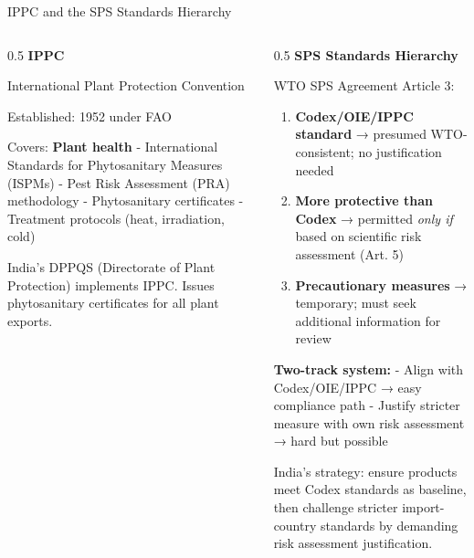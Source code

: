 \documentclass[
  ignorenonframetext,
  aspectratio=169,
]{beamer}
\makeatletter
\providecommand{\tightlist}{%
  \setlength{\itemsep}{0pt}\setlength{\parskip}{0pt}}
\let\quarto@originallabel\label
\DeclareRobustCommand*{\label}[1]{\quarto@originallabel{#1}}
\makeatother
\begin{document}
\begin{frame}{IPPC and the SPS Standards Hierarchy}
\label{ippc-and-the-sps-standards-hierarchy}
\begin{columns}[T]
\begin{column}{0.5\linewidth}
\textbf{IPPC}

International Plant Protection Convention

Established: 1952 under FAO

Covers: \textbf{Plant health} - International Standards for
Phytosanitary Measures (ISPMs) - Pest Risk Assessment (PRA) methodology
- Phytosanitary certificates - Treatment protocols (heat, irradiation,
cold)

India's DPPQS (Directorate of Plant Protection) implements IPPC. Issues
phytosanitary certificates for all plant exports.
\end{column}

\begin{column}{0.5\linewidth}
\textbf{SPS Standards Hierarchy}

WTO SPS Agreement Article 3:

\begin{enumerate}
\tightlist
\item
  \textbf{Codex/OIE/IPPC standard} → presumed WTO-consistent; no
  justification needed
\item
  \textbf{More protective than Codex} → permitted \emph{only if} based
  on scientific risk assessment (Art. 5)
\item
  \textbf{Precautionary measures} → temporary; must seek additional
  information for review
\end{enumerate}

\textbf{Two-track system:} - Align with Codex/OIE/IPPC → easy compliance
path - Justify stricter measure with own risk assessment → hard but
possible

India's strategy: ensure products meet Codex standards as baseline, then
challenge stricter import-country standards by demanding risk assessment
justification.
\end{column}
\end{columns}
\end{frame}
\end{document}
